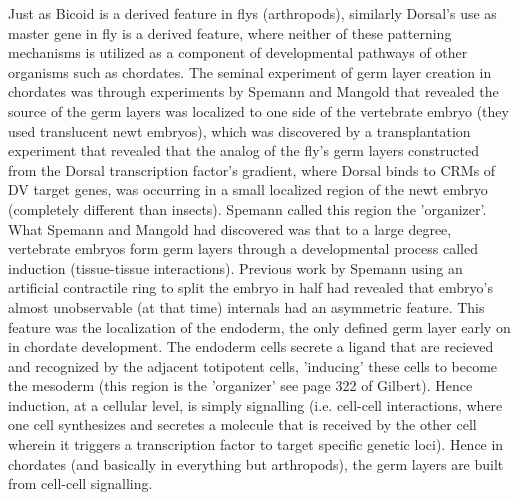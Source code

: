 
Just as Bicoid is a derived feature in flys (arthropods), similarly Dorsal's use as master gene in fly is a derived feature, where neither of these patterning mechanisms is utilized as a component of developmental pathways of other organisms such as chordates.  The seminal experiment of germ layer creation in chordates was through experiments by Spemann and Mangold that revealed the source of the germ layers was localized to one side of the vertebrate embryo (they used translucent newt embryos), which was discovered by a transplantation experiment that revealed that the analog of the fly's germ layers constructed from the Dorsal transcription factor's gradient, where Dorsal binds to CRMs of DV target genes, was occurring in a small localized region of the newt embryo (completely different than insects).  Spemann called this region the 'organizer'.  What Spemann and Mangold had discovered was that to a large degree, vertebrate embryos form germ layers through a developmental process called induction (tissue-tissue interactions).  Previous work by Spemann using an artificial contractile ring to split the embryo in half had revealed that embryo's almost unobservable (at that time) internals had an asymmetric feature.  This feature was the localization of the endoderm, the only defined germ layer early on in chordate development.  The endoderm cells secrete a ligand that are recieved and recognized by the adjacent totipotent cells, 'inducing' these cells to become the mesoderm (this region is the 'organizer' see page 322 of Gilbert\cite{devogilbert}).  Hence induction, at a cellular level, is simply signalling (i.e. cell-cell interactions, where one cell synthesizes and secretes a molecule that is received by the other cell wherein it triggers a transcription factor to target specific genetic loci).  Hence in chordates (and basically in everything but arthropods), the germ layers are built from cell-cell signalling.  

